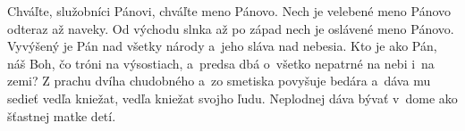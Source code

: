 Chváľte, služobníci Pánovi,
chváľte meno Pánovo.
\versseparator
Nech je velebené meno Pánovo
odteraz až naveky.
\versseparator
Od východu slnka až po západ
nech je oslávené meno Pánovo.
\versseparator
Vyvýšený je Pán nad všetky národy
a~jeho sláva nad nebesia.
\versseparator
Kto je ako Pán, náš Boh,
čo tróni na výsostiach,
a~predsa dbá o~všetko nepatrné
na nebi i~na zemi?
\versseparator
Z prachu dvíha chudobného
a~zo smetiska povyšuje bedára
\versseparator
a~dáva mu sedieť vedľa kniežat,
vedľa kniežat svojho ľudu.
\versseparator
Neplodnej dáva bývať v~dome
ako šťastnej matke detí.